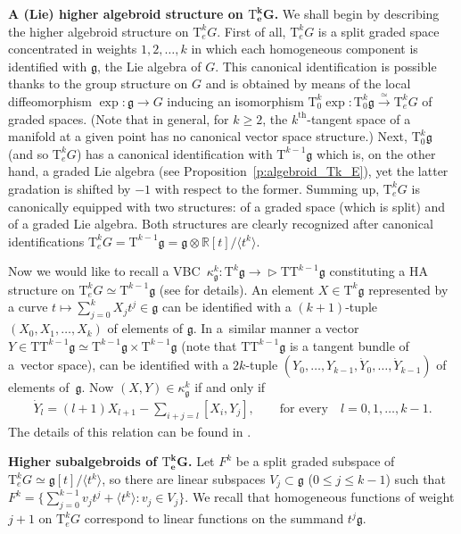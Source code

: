 \documentclass[10pt,a4paper]{amsart}
\newcommand{\ZM}{{VBC}} %
\newcommand{\thh}[1]{#1^{\mathrm{th}}} %
\newcommand{\R}{\mathbb{R}}
\newcommand{\ideal}[1]{\langle {#1} \rangle}
\newcommand{\ra}{\rightarrow}
\newcommand{\T}{\mathrm{T}} %
\newcommand{\TT}[1]{\mathrm{T}^{#1}} %
\newcommand{\g}{\mathfrak{g}} %
\def\relto{\rightarrow\!\!\vartriangleright} %
\numberwithin{equation}{section}
\theoremstyle{definition}
\begin{document}
{\bf A (Lie) higher algebroid structure on $\boldsymbol{\TT{k}_eG}$.}
 We shall begin by describing the higher algebroid structure on $\TT{k}_eG$. First of all, $\TT{k}_e G$ is a split graded space concentrated in weights $1,2, \ldots, k$ in which each homogeneous component is identified with $\g$, the Lie algebra of $G$. This canonical identification is possible thanks to the group structure on $G$ and is obtained by means of the local diffeomorphism $\exp\colon \g\ra G$ inducing an isomorphism $\TT{k}_0 \exp\colon \TT{k}_0\g \xrightarrow{\simeq} \TT{k}_e G$ of graded spaces. (Note that in general, for $k\geq 2$, the $\thh{k}$-tangent space of a manifold at a given point has no canonical vector space structure.) Next, $\TT{k}_0 \g$ (and so $\TT{k}_e G$) has a canonical identification with $\TT{k-1} \g$ which is, on the other hand, a graded Lie algebra (see Proposition~\ref{p:algebroid_Tk_E}), yet the latter gradation is shifted by $-1$ with respect to the former. Summing up, $\TT{k}_e G$ is canonically equipped with two structures: of a graded space (which is split) and of a graded Lie algebra. Both structures are clearly recognized after canonical identifications $\TT{k}_e G = \TT{k-1}\g = \g\otimes \R[t]/\ideal{t^k}$.

Now we would like to recall a \ZM\ $\kappa^k_\g\colon \TT{k}\g\relto \T\TT{k-1}\g$ constituting a HA structure on $\TT{k}_eG\simeq\TT{k-1}\g$ (see \cite[Section~6]{MJ_MR_models_high_alg_2015} for details). An element $X\in\TT{k}\g$ represented by a curve $t\mapsto \sum_{j=0}^k X_j t^j\in\g$ can be identified with a $(k+1)$-tuple $(X_0,X_1,\hdots,X_k)$ of elements of $\g$. In a~similar manner a vector $Y \in \T \TT{k-1} \g\simeq \TT{k-1}\g\times\TT{k-1}\g$ (note that $\T\TT{k-1}\g$ is a tangent bundle of a~vector space), can be identified with a $2k$-tuple $(Y_0,\hdots,Y_{k-1},\dot Y_0,\hdots,\dot Y_{k-1})$ of elements of~$\g$. Now $(X,Y)\in\kappa^k_\g$ if and only if
\begin{gather}\label{eqn:kappa_l_GG_expd}
\dot Y_{l} = (l+1) X_{l+1} - \sum_{i+j=l} [X_i, Y_j],\qquad\text{for every} \quad l=0,1,\hdots,k-1.
\end{gather}
The details of this relation can be found in \cite[Proposition~6.3]{MJ_MR_models_high_alg_2015}.

{\bf Higher subalgebroids of $\boldsymbol{\TT{k}_e G}$.} Let $F^k$ be a split graded subspace of $\T_e^k G \simeq \g[t]/\ideal{t^k}$, so there are linear subspaces $V_j\subset \g$ ($0\leq j\leq k-1$) such that $F^k = \big\{\sum_{j=0}^{k-1} v_j t^j +\ideal{t^k}\colon v_j\in V_j\big\}$. We recall that homogeneous functions of weight $j+1$ on $\T_e^k G$ correspond to linear functions on the summand $t^j \g$.
\end{document}
